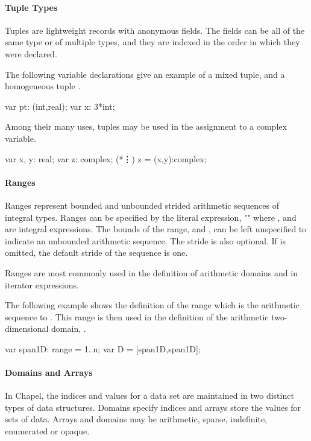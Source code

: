 \paragraph{Tuple Types}
Tuples are lightweight records with anonymous fields.
The fields can be all of the same type or of multiple types, and
they are indexed in the order in which they were declared.
\begin{example}
The following variable declarations give an example of a mixed tuple,
 and a homogeneous tuple .
\begin{chapel}
var pt: (int,real);
var x: 3*int;
\end{chapel}

Among their many uses, tuples may be used in the assignment to a
complex variable.
\begin{chapel}
var x, y: real;
var z: complex;
(*\vdots*)
z = (x,y):complex;
\end{chapel}
\end{example}

\paragraph{Ranges}
Ranges represent bounded and unbounded strided 
arithmetic sequences of integral types.  Ranges can be specified by the 
literal expression, "" where ,
 and  are integral expressions.  The bounds
of the range,  and , can be left unspecified to
indicate an unbounded arithmetic sequence.  The stride is also optional.
If  is omitted, the default stride of the sequence is one. 

Ranges are most commonly used in the definition of arithmetic domains
and in iterator expressions.

\begin{example}
The following example shows the definition of the range 
which is the arithmetic sequence  to .  This range is
then used in the definition of the arithmetic two-dimensional domain, 
.
 
\begin{chapel}
var span1D: range = 1..n;
var D = [span1D,span1D];
\end{chapel}
\end{example}

\paragraph{Domains and Arrays}
In Chapel, the indices and values for a data set are maintained
in two distinct types of data structures.  Domains specify indices
and arrays store the values for sets of data.  Arrays and domains may
be arithmetic, sparse, indefinite, enumerated or opaque.

